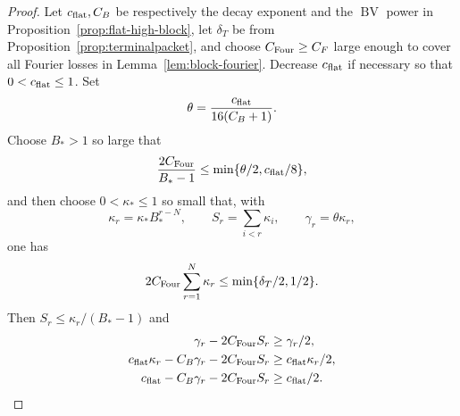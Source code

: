 \documentclass[11pt]{article}
\numberwithin{equation}{section}
\theoremstyle{remark}
\theoremstyle{definition}
\newcommand{\BV}{\operatorname{BV}}
\begin{document}
\begin{proof}
Let $c_{\rm flat},C_B$ be respectively the decay exponent and the $\BV$
power in Proposition~\ref{prop:flat-high-block}, let $\delta_T$ be from
Proposition~\ref{prop:terminalpacket}, and choose
$C_{\rm Four}\ge C_F$ large enough to cover all Fourier losses in
Lemma~\ref{lem:block-fourier}.  Decrease $c_{\rm flat}$ if necessary so that
$0<c_{\rm flat}\le1$.  Set
\[
 \theta=\frac{c_{\rm flat}}{16(C_B+1)}.
\]
Choose $B_*>1$ so large that
\begin{equation}\label{eq:packet-hierarchy-ratio}
 \frac{2C_{\rm Four}}{B_*-1}
 \le\min\{\theta/2,c_{\rm flat}/8\},
\end{equation}
and then choose $0<\kappa_*\le1$ so small that, with
\begin{equation}\label{eq:packet-hierarchy}
 \kappa_r=\kappa_*B_*^{r-N},\qquad
 S_r=\sum_{i<r}\kappa_i,\qquad \gamma_r=\theta\kappa_r,
\end{equation}
one has
\begin{equation}\label{eq:packet-hierarchy-terminal}
 2C_{\rm Four}\sum_{r=1}^N\kappa_r\le\min\{\delta_T/2,1/2\}.
\end{equation}
Then $S_r\le\kappa_r/(B_*-1)$ and
\begin{align}
 \gamma_r-2C_{\rm Four}S_r&\ge\gamma_r/2,
 \label{eq:packet-hierarchy-a}\\
 c_{\rm flat}\kappa_r-C_B\gamma_r-2C_{\rm Four}S_r
 &\ge c_{\rm flat}\kappa_r/2,
 \label{eq:packet-hierarchy-b}\\
 c_{\rm flat}-C_B\gamma_r-2C_{\rm Four}S_r&\ge c_{\rm flat}/2.
 \label{eq:packet-hierarchy-c}
\end{align}


\end{proof}
\end{document}
